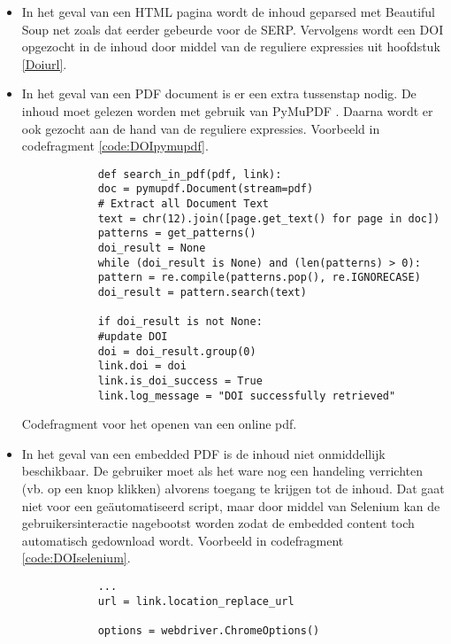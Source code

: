 \begin{itemize}
    \item In het geval van een HTML pagina wordt de inhoud geparsed met Beautiful Soup net zoals dat eerder gebeurde voor de SERP. Vervolgens wordt een DOI opgezocht in de inhoud door middel van de reguliere expressies uit hoofdstuk \ref{Doiurl}.
    \item In het geval van een PDF document is er een extra tussenstap nodig. De inhoud moet gelezen worden met gebruik van PyMuPDF \autocite{Pymupdf2025}. Daarna wordt er ook gezocht aan de hand van de reguliere expressies. Voorbeeld in codefragment \ref{code:DOIpymupdf}.
    \begin{listing}
        \begin{verbatim}
            def search_in_pdf(pdf, link):
            doc = pymupdf.Document(stream=pdf)
            # Extract all Document Text
            text = chr(12).join([page.get_text() for page in doc])
            patterns = get_patterns()
            doi_result = None
            while (doi_result is None) and (len(patterns) > 0):
            pattern = re.compile(patterns.pop(), re.IGNORECASE)
            doi_result = pattern.search(text)
            
            if doi_result is not None:
            #update DOI
            doi = doi_result.group(0)
            link.doi = doi
            link.is_doi_success = True
            link.log_message = "DOI successfully retrieved"
        \end{verbatim}
        \caption[Pymupdf codefragment]{Codefragment voor het openen van een online pdf.}
        \label{code:DOIpymupdf}
    \end{listing}
    \item In het geval van een embedded PDF is de inhoud niet onmiddellijk beschikbaar. De gebruiker moet als het ware nog een handeling verrichten (vb. op een knop klikken) alvorens toegang te krijgen tot de inhoud. Dat gaat niet voor een geäutomatiseerd script, maar door middel van Selenium \autocite{Selenium2025} kan de gebruikersinteractie nagebootst worden zodat de embedded content toch automatisch gedownload wordt. Voorbeeld in codefragment \ref{code:DOIselenium}.
    \begin{listing}
        \begin{verbatim}
            ...
            url = link.location_replace_url
            
            options = webdriver.ChromeOptions()
            

\end{verbatim}
\end{listing}
\end{itemize}
